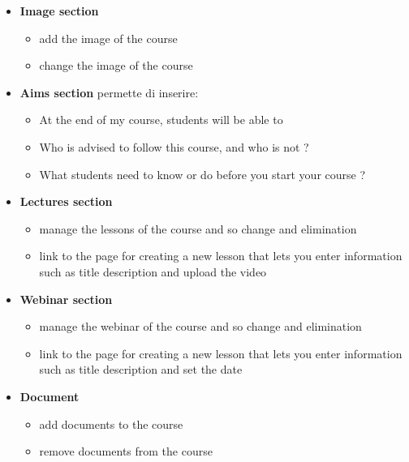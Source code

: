 \begin{itemize}

\item \textbf{Image section}\par
\begin{itemize}
  \item add the image of the course
  \item change the image of the course
\end{itemize}

\item \textbf{Aims section} permette di inserire:

\begin{itemize}
  \item At the end of my course, students will be able to
  \item Who is advised to follow this course, and who is not ?
  \item What students need to know or do before you start your course ?
\end{itemize}

\item \textbf{Lectures section}\par 
\begin{itemize}
  \item manage the lessons of the course and so change and elimination
  \item link to the page for creating a new lesson that lets you enter information such as title description and upload the video  
\end{itemize}


\item \textbf{Webinar section}\par
\begin{itemize}
  \item manage the webinar of the course and so change and elimination
  \item link to the page for creating a new lesson that lets you enter information such as title description and set the date
\end{itemize}


\item \textbf{Document}\par
\begin{itemize}
  \item add documents to the course
  \item remove documents from the course
\end{itemize}

\end{itemize}


